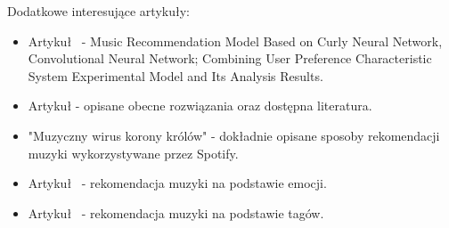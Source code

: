 \documentclass[a4paper,titleauthor]{mwart}
\begin{document}
Dodatkowe interesujące artykuły:
\begin{itemize}
    \item Artykuł~\cite{zhang2022music} - Music Recommendation Model Based on Curly Neural Network, Convolutional Neural Network; Combining User Preference Characteristic System Experimental Model and Its Analysis Results.
    \item Artykuł \cite{schedl2019deep} - opisane obecne rozwiązania oraz dostępna literatura.
    \item "Muzyczny wirus korony królów" \cite{muzycznywirus} - dokładnie opisane sposoby rekomendacji muzyki wykorzystywane przez Spotify.
    \item Artykuł~\cite{deng2015emotional} - rekomendacja muzyki na podstawie emocji.
    \item Artykuł~\cite{horsburgh2015learning} - rekomendacja muzyki na podstawie tagów.
\end{itemize}

\newpage

\begin{doublespace}

\renewcommand{\refname}{Bibliografia}

\nocite{*}

\end{doublespace}
\end{document}
